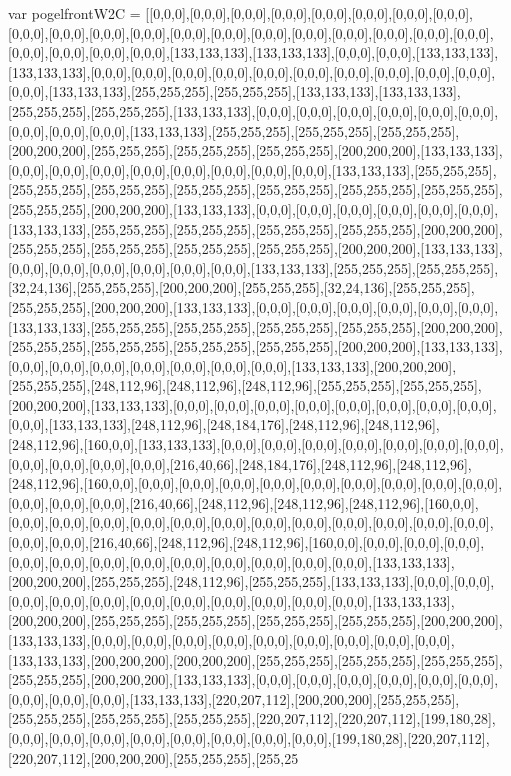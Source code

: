 var pogelfrontW2C = [[0,0,0],[0,0,0],[0,0,0],[0,0,0],[0,0,0],[0,0,0],[0,0,0],[0,0,0],[0,0,0],[0,0,0],[0,0,0],[0,0,0],[0,0,0],[0,0,0],[0,0,0],[0,0,0],[0,0,0],[0,0,0],[0,0,0],[0,0,0],[0,0,0],[0,0,0],[0,0,0],[0,0,0],[133,133,133],[133,133,133],[0,0,0],[0,0,0],[133,133,133],[133,133,133],[0,0,0],[0,0,0],[0,0,0],[0,0,0],[0,0,0],[0,0,0],[0,0,0],[0,0,0],[0,0,0],[0,0,0],[0,0,0],[133,133,133],[255,255,255],[255,255,255],[133,133,133],[133,133,133],[255,255,255],[255,255,255],[133,133,133],[0,0,0],[0,0,0],[0,0,0],[0,0,0],[0,0,0],[0,0,0],[0,0,0],[0,0,0],[0,0,0],[133,133,133],[255,255,255],[255,255,255],[255,255,255],[200,200,200],[255,255,255],[255,255,255],[255,255,255],[200,200,200],[133,133,133],[0,0,0],[0,0,0],[0,0,0],[0,0,0],[0,0,0],[0,0,0],[0,0,0],[0,0,0],[133,133,133],[255,255,255],[255,255,255],[255,255,255],[255,255,255],[255,255,255],[255,255,255],[255,255,255],[255,255,255],[200,200,200],[133,133,133],[0,0,0],[0,0,0],[0,0,0],[0,0,0],[0,0,0],[0,0,0],[133,133,133],[255,255,255],[255,255,255],[255,255,255],[255,255,255],[200,200,200],[255,255,255],[255,255,255],[255,255,255],[255,255,255],[200,200,200],[133,133,133],[0,0,0],[0,0,0],[0,0,0],[0,0,0],[0,0,0],[0,0,0],[133,133,133],[255,255,255],[255,255,255],[32,24,136],[255,255,255],[200,200,200],[255,255,255],[32,24,136],[255,255,255],[255,255,255],[200,200,200],[133,133,133],[0,0,0],[0,0,0],[0,0,0],[0,0,0],[0,0,0],[0,0,0],[133,133,133],[255,255,255],[255,255,255],[255,255,255],[255,255,255],[200,200,200],[255,255,255],[255,255,255],[255,255,255],[255,255,255],[200,200,200],[133,133,133],[0,0,0],[0,0,0],[0,0,0],[0,0,0],[0,0,0],[0,0,0],[0,0,0],[133,133,133],[200,200,200],[255,255,255],[248,112,96],[248,112,96],[248,112,96],[255,255,255],[255,255,255],[200,200,200],[133,133,133],[0,0,0],[0,0,0],[0,0,0],[0,0,0],[0,0,0],[0,0,0],[0,0,0],[0,0,0],[0,0,0],[133,133,133],[248,112,96],[248,184,176],[248,112,96],[248,112,96],[248,112,96],[160,0,0],[133,133,133],[0,0,0],[0,0,0],[0,0,0],[0,0,0],[0,0,0],[0,0,0],[0,0,0],[0,0,0],[0,0,0],[0,0,0],[0,0,0],[216,40,66],[248,184,176],[248,112,96],[248,112,96],[248,112,96],[160,0,0],[0,0,0],[0,0,0],[0,0,0],[0,0,0],[0,0,0],[0,0,0],[0,0,0],[0,0,0],[0,0,0],[0,0,0],[0,0,0],[0,0,0],[216,40,66],[248,112,96],[248,112,96],[248,112,96],[160,0,0],[0,0,0],[0,0,0],[0,0,0],[0,0,0],[0,0,0],[0,0,0],[0,0,0],[0,0,0],[0,0,0],[0,0,0],[0,0,0],[0,0,0],[0,0,0],[0,0,0],[216,40,66],[248,112,96],[248,112,96],[160,0,0],[0,0,0],[0,0,0],[0,0,0],[0,0,0],[0,0,0],[0,0,0],[0,0,0],[0,0,0],[0,0,0],[0,0,0],[0,0,0],[0,0,0],[133,133,133],[200,200,200],[255,255,255],[248,112,96],[255,255,255],[133,133,133],[0,0,0],[0,0,0],[0,0,0],[0,0,0],[0,0,0],[0,0,0],[0,0,0],[0,0,0],[0,0,0],[0,0,0],[0,0,0],[133,133,133],[200,200,200],[255,255,255],[255,255,255],[255,255,255],[255,255,255],[200,200,200],[133,133,133],[0,0,0],[0,0,0],[0,0,0],[0,0,0],[0,0,0],[0,0,0],[0,0,0],[0,0,0],[0,0,0],[133,133,133],[200,200,200],[200,200,200],[255,255,255],[255,255,255],[255,255,255],[255,255,255],[200,200,200],[133,133,133],[0,0,0],[0,0,0],[0,0,0],[0,0,0],[0,0,0],[0,0,0],[0,0,0],[0,0,0],[0,0,0],[133,133,133],[220,207,112],[200,200,200],[255,255,255],[255,255,255],[255,255,255],[255,255,255],[220,207,112],[220,207,112],[199,180,28],[0,0,0],[0,0,0],[0,0,0],[0,0,0],[0,0,0],[0,0,0],[0,0,0],[0,0,0],[199,180,28],[220,207,112],[220,207,112],[200,200,200],[255,255,255],[255,25